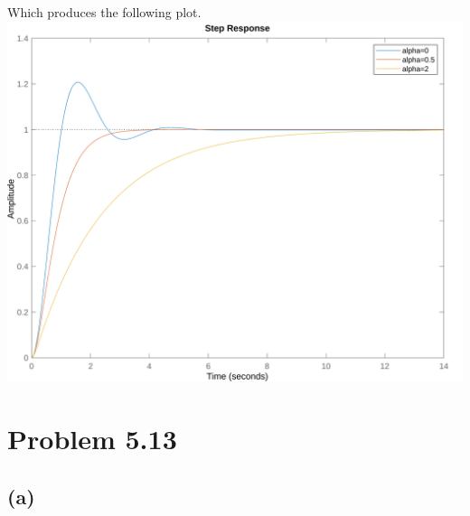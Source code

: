 \documentclass[12pt]{article}
\begin{document}
Which produces the following plot.\\
\includegraphics[scale=0.25]{Problem1fig4.png}\\
\section*{Problem 5.13}
\subsection*{(a)}
\end{document}
